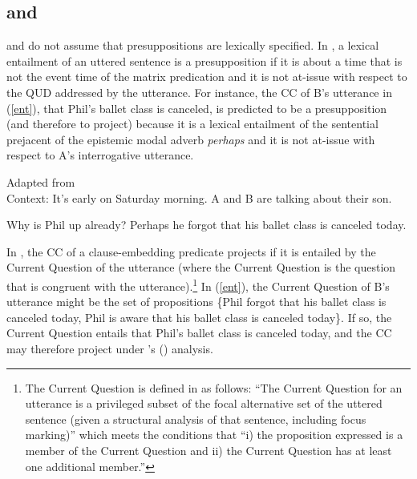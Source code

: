 \documentclass[11pt,fleqn]{article}
\newcommand{\6}{\mbox{$[\hspace*{-.6mm}[$}}
\newcommand{\9}{\mbox{$]\hspace*{-.6mm}]$}}
\newcommand{\citetpos}[1]{\citeauthor{#1}'s (\citeyear{#1})}
\begin{document}
\subsection{\cite{abrusan2011,abrusan2016} and \cite*{best-question}}\label{s42}

\cite{abrusan2011,abrusan2016} and \cite{best-question} do not assume that presuppositions are lexically specified. In \cite{abrusan2011,abrusan2016}, a lexical entailment of an uttered sentence is a presupposition if it is about a time that is not the event time of the matrix predication and it is not at-issue with respect to the QUD addressed by the utterance. For instance, the CC of B's utterance in (\ref{ent}), that Phil's ballet class is canceled, is predicted to be a presupposition (and therefore to project) because it is a lexical entailment of the sentential prejacent of the epistemic modal adverb \emph{perhaps} and it is not at-issue with respect to A's interrogative utterance. 

\begin{exe}
\ex \label{ent} Adapted from \citealt[188]{best-question} \\ Context: It's early on Saturday morning. A and B are talking about their son. 
\begin{xlist}
 Why is Phil up already?
 Perhaps he forgot that his ballet class is canceled today. 
\end{xlist}
\end{exe}

In \cite{best-question}, the CC of a clause-embedding predicate projects if it is entailed by the Current Question of the utterance (where the Current Question is the question that is congruent with the utterance).\footnote{The Current Question is defined in \citet[194]{best-question} as follows: ``The Current Question for an utterance is a privileged subset of the focal alternative set of the uttered sentence (given a structural analysis of that sentence, including focus marking)'' which meets the conditions that ``i) the proposition expressed is a member of the Current Question and ii) the Current Question has at least one additional member.''} In (\ref{ent}), the Current Question of B's utterance might be the set of propositions \{Phil forgot that his ballet class is canceled today, Phil is aware that his ballet class is canceled today\}. If so, the Current Question entails that Phil's ballet class is canceled today, and the CC may therefore project under \citetpos{best-question} analysis.
\end{document}
